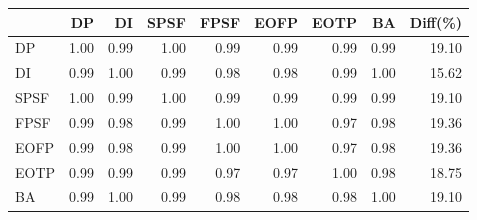 \begin{tabular}{l|rrrrrrr|r}
\toprule
 & DP & DI & SPSF & FPSF & EOFP & EOTP & BA & Diff(\%)  \\
\midrule
DP & 1.00 & 0.99 & 1.00 & 0.99 & 0.99 & 0.99 & 0.99 & 19.10  \\
DI & 0.99 & 1.00 & 0.99 & 0.98 & 0.98 & 0.99 & 1.00 & 15.62  \\
SPSF & 1.00 & 0.99 & 1.00 & 0.99 & 0.99 & 0.99 & 0.99 & 19.10  \\
FPSF & 0.99 & 0.98 & 0.99 & 1.00 & 1.00 & 0.97 & 0.98 & 19.36  \\
EOFP & 0.99 & 0.98 & 0.99 & 1.00 & 1.00 & 0.97 & 0.98 & 19.36  \\
EOTP & 0.99 & 0.99 & 0.99 & 0.97 & 0.97 & 1.00 & 0.98 & 18.75  \\
BA & 0.99 & 1.00 & 0.99 & 0.98 & 0.98 & 0.98 & 1.00 & 19.10  \\
\bottomrule
\end{tabular}

